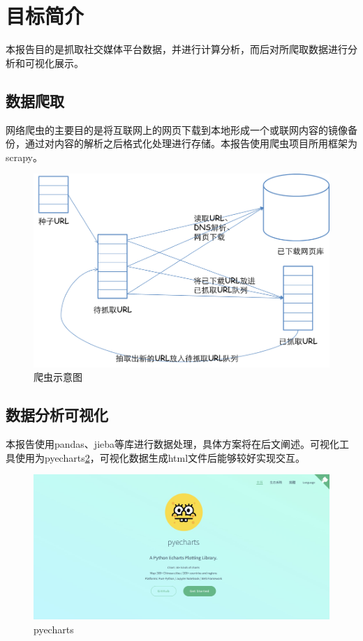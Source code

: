 \section{目标简介}
本报告目的是抓取社交媒体平台数据，并进行计算分析，而后对所爬取数据进行分析和可视化展示。

\subsection{数据爬取}
网络爬虫的主要目的是将互联网上的网页下载到本地形成一个或联网内容的镜像备份，通过对内容的解析之后格式化处理进行存储。本报告使用爬虫项目所用框架为scrapy。
\begin{figure}[H]
\centering
\includegraphics[width=12cm]{figure/spider.png}
\caption{爬虫示意图} \label{fig:spider}
\end{figure}

\subsection{数据分析可视化}
本报告使用pandas、jieba等库进行数据处理，具体方案将在后文阐述。可视化工具使用为pyecharts\ref{fig:pyecharts}，可视化数据生成html文件后能够较好实现交互。
\begin{figure}[H]
\centering
\includegraphics[width=12cm]{figure/pyecharts.jpg}
\caption{pyecharts} \label{fig:pyecharts}
\end{figure}


